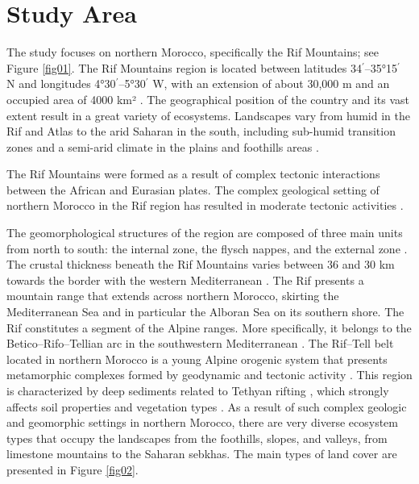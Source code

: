 \documentclass[geomatics,article,accept,pdftex,oneauthor]{Definitions/mdpi}
\begin{document}
\section{Study Area}

The study focuses on northern Morocco, specifically the Rif Mountains; see Figure \ref{fig01}. The Rif Mountains region is located between latitudes 34$^\prime$--35°15$^\prime$ N and longitudes 4°30$^\prime$--5°30$^\prime$ W, with an extension of about 30,000 m and an occupied area of 4000 km² \cite{ABOUTOFAIL2024112522}. The geographical position of the country and its vast extent result in a great variety of ecosystems. Landscapes vary from humid in the Rif and Atlas to the arid Saharan in the south, including sub-humid transition zones and a semi-arid climate in the plains and foothills areas \cite{MCGREGOR20091434}. 


The Rif Mountains were formed as a result of complex tectonic interactions between the African and Eurasian plates. The complex geological setting of northern Morocco in the Rif region has resulted in moderate tectonic activities \cite{CRINITI2024106861,PARISH199945}. 

The geomorphological structures of the region are composed of three main units from north to south: the internal zone, the flysch nappes, and the external zone \cite{ELTALIBI2014554,BONARDI2003149}. The crustal thickness beneath the Rif Mountains varies between 36 and 30 km towards the border with the western Mediterranean \cite{MAATE2000409}. The Rif presents a mountain range that extends across northern Morocco, skirting the Mediterranean Sea and in particular the Alboran Sea on its southern shore. The Rif constitutes a segment of the Alpine ranges. More specifically, it belongs to the Betico--Rifo--Tellian arc in the southwestern Mediterranean \cite{SLIMANI2019101785}. The Rif--Tell belt located in northern Morocco is a young Alpine orogenic system that presents metamorphic complexes formed by geodynamic and tectonic activity \cite{MARTINMARTIN2023106367,AITBRAHIM2002187,LEBLANC1984345}. This region is characterized by deep sediments related to Tethyan rifting \cite{ARANA1974197,PERRI2022105811,TALMAT2025105515}, which strongly affects soil properties and vegetation types \cite{CHAKKOUR2024,HAMOUCH2024}. As a result of such complex geologic and geomorphic settings in northern Morocco, there are very diverse ecosystem types that occupy the landscapes from the foothills, slopes, and valleys, from limestone mountains to the Saharan sebkhas. The main types of land cover are presented in Figure \ref{fig02}.
\end{document}
